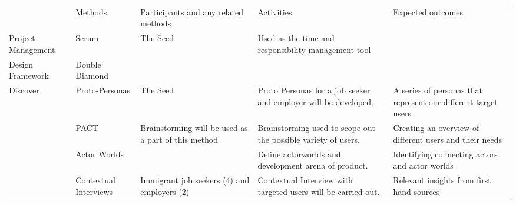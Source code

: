 \newcolumntype{b}{X}

\begin{tabularx}{\textwidth}{|>{} s | s | b | b | b |}


     \\
    \hline
    \hline
     & Methods    & Participants and any related methods    &  Activities & Expected outcomes        \\
    \hline
 \hline
             Project Management & Scrum \cite{Scrum}                              & The Seed                                                                                             & Used as the time and responsibility management tool       &                                                                                           \\ \hline
             \hline
Design Framework   & Double Diamond \cite{DoubleDiamond}                    &                                                                                                                         &   &                                                                                                                                                                                                                                            \\ \hline
\hline
Discover           & Proto-Personas      \cite{Protopersonas}                           & The Seed                                                                                                             &                     Proto Personas for a job seeker and employer will be developed.   & A series of personas that represent our different target users                                                                            \\ \hline
                  
                   & PACT       \cite{PACT}                        & Brainstorming will be used as a part of this method                                                                   & Brainstorming used to scope out the possible variety of users.  &  Creating an overview of different users and their needs                                                                                         \\ \hline
                    & Actor Worlds \cite{Arena} &                                                                                                                         & Define actorworlds and development arena of product.
                    & Identifying connecting actors and actor worlds
                    \\ \hline
                    & Contextual Interviews   \cite{ContextualDesign}           & Immigrant job seekers (4) and employers (2)                                                                                             & Contextual Interview with targeted users will be carried out. & Relevant insights from first hand sources
                    

\end{tabularx}
